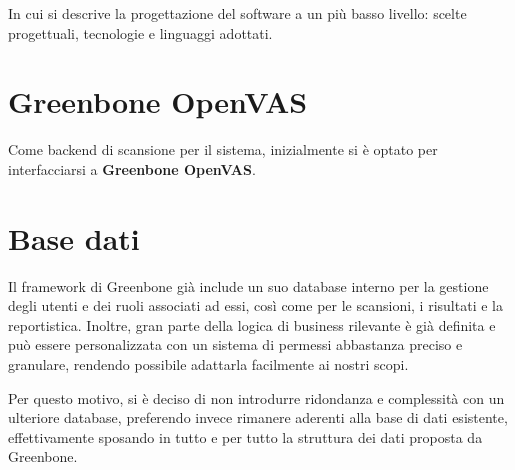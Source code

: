 In cui si descrive la progettazione del software a un più basso livello: scelte progettuali, tecnologie e linguaggi adottati.

\section{Greenbone OpenVAS}
Come backend di scansione per il sistema, inizialmente si è optato per interfacciarsi a \textbf{Greenbone OpenVAS}.

\section{Base dati}
Il framework di Greenbone già include un suo database interno per la gestione degli utenti e dei ruoli associati ad essi, così come per le scansioni, i risultati e la reportistica. Inoltre, gran parte della logica di business rilevante è già definita e può essere personalizzata con un sistema di permessi abbastanza preciso e granulare, rendendo possibile adattarla facilmente ai nostri scopi.

Per questo motivo, si è deciso di non introdurre ridondanza e complessità con un ulteriore database, preferendo invece rimanere aderenti alla base di dati esistente, effettivamente sposando in tutto e per tutto la struttura dei dati proposta da Greenbone.

